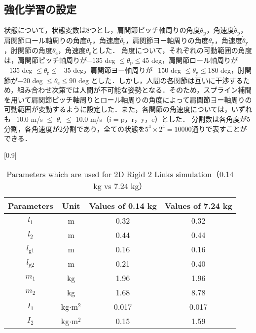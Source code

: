 \subsection{強化学習の設定}
状態について，状態変数は8つとし，肩関節ピッチ軸周りの角度$\theta_{\mathrm{p}}$，角速度$\dot{\theta}_{\mathrm{p}}$，肩関節ロール軸周りの角度$\theta_{\mathrm{r}}$，角速度$\dot{\theta}_{\mathrm{r}}$，肩関節ヨー軸周りの角度$\theta_{\mathrm{y}}$，角速度$\dot{\theta}_{\mathrm{y}}$，肘関節の角度$\theta_{\mathrm{e}}$，角速度$\dot{\theta}_{\mathrm{e}}$とした．
角度について，それぞれの可動範囲の角度は，肩関節ピッチ軸周りが$-135$ deg $\leq\theta_{\mathrm{p}}\leq45$  deg，肩関節ロール軸周りが$-135$ deg $\leq\theta_{\mathrm{r}}\leq-35$ deg，肩関節ヨー軸周りが$-150$ deg $\leq\theta_{\mathrm{y}}\leq180$ deg，肘関節が$-20$ deg $\leq\theta_{\mathrm{e}}\leq90$ deg とした\cite{range}．しかし，人間の各関節は互いに干渉するため，組み合わせ次第では人間が不可能な姿勢となる．そのため，スプライン補間\cite{spline}を用いて肩関節ピッチ軸周りとロール軸周りの角度によって肩関節ヨー軸周りの可動範囲が変動するように設定した．また，各関節の角速度については，いずれも$-10.0$ m/s $\le$ $\dot{\theta}_{i}$ $\le$ 10.0 m/s（$i = \mathrm{p，r，y，e}$）とした．
分割数は各角度が5分割，各角速度が2分割であり，全ての状態を$5^{4}\times 2^{4}=10000$通りで表すことができる．\\
\begin{table}[t]
  \begin{center}
    \caption{Parameters which are used for 2D Rigid 2 Links simulation（0.14 kg vs 7.24 kg）}
    \scalebox{0.9}[0.9]{
    \begin{tabular}{c|c|c|c}
      \hline
      Parameters & Unit & Values of 0.14 kg & Values of 7.24 kg \\
      \hline
      $l_{1}$ & m & 0.32 & 0.32\\
      $l_{2}$ & m & 0.44 & 0.44\\
      $l_{\mathrm{g1}}$ & m & 0.16 & 0.16 \\
      $l_{\mathrm{g2}}$ & m & 0.21 & 0.40 \\
      $m_{1}$ & kg & 1.96 & 1.96\\
      $m_{2}$ & kg & 1.68 & 8.78 \\
      $I_{1}$ & kg$\cdot$$\mathrm{m}^2$ & 0.017 & 0.017 \\
      $I_{2}$ & kg$\cdot$$\mathrm{m}^2$ & 0.15 & 1.59 \\
      \hline
    \end{tabular}
    }
  \end{center}
\end{table}
